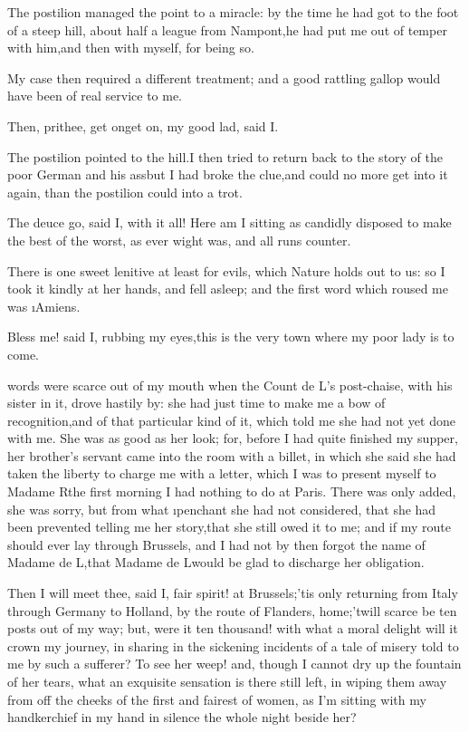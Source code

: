 \documentclass[twoside]{article}
\begin{document}
The postilion managed the point to a miracle: by the time he had got to
the foot of a steep hill, about half a league from Nampont,\tsk he had put me
out of temper with him,\tsk and then with myself, for being so.

My case then required a different treatment; and a good rattling gallop
would have been of real service to me.\tsk 

\tsk Then, prithee, get on\tsk get on, my good lad, said I.

The postilion pointed to the hill.\tsk I then tried to return back to the
story of the poor German and his ass\tsk but I had broke the clue,\tsk and could
no more get into it again, than the postilion could into a trot.

\tsk The deuce go, said I, with it all!  Here am I sitting as candidly
disposed to make the best of the worst, as ever wight was, and all runs
counter.

There is one sweet lenitive at least for evils, which Nature holds out to
us: so I took it kindly at her hands, and fell asleep; and the first word
which roused me was \i{Amiens}.

\tsk Bless me! said I, rubbing my eyes,\tsk this is the very town where my poor
lady is to come.






 words were scarce out of my mouth when the Count de L\tsk ’s post-chaise,
with his sister in it, drove hastily by: she had just time to make me a
bow of recognition,\tsk and of that particular kind of it, which told me she
had not yet done with me.  She was as good as her look; for, before I had
quite finished my supper, her brother’s servant came into the room with a
billet, in which she said she had taken the liberty to charge me with a
letter, which I was to present myself to Madame R\tsk  the first morning I
had nothing to do at Paris.  There was only added, she was sorry, but
from what \i{penchant} she had not considered, that she had been prevented
telling me her story,\tsk that she still owed it to me; and if my route
should ever lay through Brussels, and I had not by then forgot the name
of Madame de L\tsk ,\tsk that Madame de L\tsk  would be glad to discharge her
obligation.

Then I will meet thee, said I, fair spirit! at Brussels;\tsk ’tis only
returning from Italy through Germany to Holland, by the route of
Flanders, home;\tsk ’twill scarce be ten posts out of my way; but, were it
ten thousand! with what a moral delight will it crown my journey, in
sharing in the sickening incidents of a tale of misery told to me by such
a sufferer?  To see her weep! and, though I cannot dry up the fountain of
her tears, what an exquisite sensation is there still left, in wiping
them away from off the cheeks of the first and fairest of women, as I’m
sitting with my handkerchief in my hand in silence the whole night beside
her?
\end{document}

